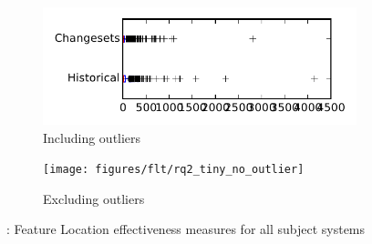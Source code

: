 
\begin{figure}
    \centering
    \begin{subfigure}{.4\textwidth}
        \centering
        \includegraphics[height=0.4\textheight]{figures/flt/rq2_tiny}
        \caption{Including outliers}\label{fig:flt:rq2:tiny_outlier}
    \end{subfigure}%
    \begin{subfigure}{.4\textwidth}
        \centering
        \texttt{[image: figures/flt/rq2\_tiny\_no\_outlier]}
        \caption{Excluding outliers}\label{fig:flt:rq2:tiny_no_outlier}
    \end{subfigure}
\caption{\ftwo: Feature Location effectiveness measures for all subject systems}
\label{fig:flt:rq2:tiny}
\end{figure}
